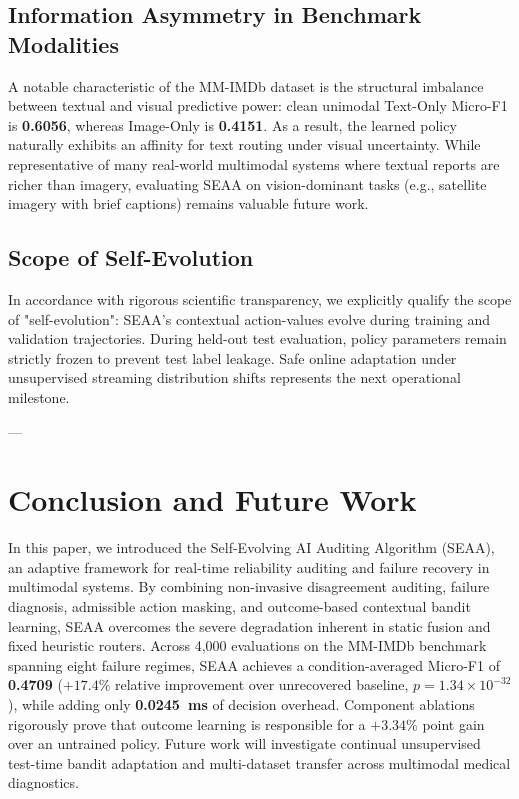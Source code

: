 \documentclass[journal]{IEEEtran}
\begin{document}
\subsection{Information Asymmetry in Benchmark Modalities}
A notable characteristic of the MM-IMDb dataset is the structural imbalance between textual and visual predictive power: clean unimodal Text-Only Micro-F1 is \textbf{0.6056}, whereas Image-Only is \textbf{0.4151}. As a result, the learned policy naturally exhibits an affinity for text routing under visual uncertainty. While representative of many real-world multimodal systems where textual reports are richer than imagery, evaluating SEAA on vision-dominant tasks (e.g., satellite imagery with brief captions) remains valuable future work.

\subsection{Scope of Self-Evolution}
In accordance with rigorous scientific transparency, we explicitly qualify the scope of "self-evolution": SEAA's contextual action-values evolve during training and validation trajectories. During held-out test evaluation, policy parameters remain strictly frozen to prevent test label leakage. Safe online adaptation under unsupervised streaming distribution shifts represents the next operational milestone.

---

\section{Conclusion and Future Work}
In this paper, we introduced the Self-Evolving AI Auditing Algorithm (SEAA), an adaptive framework for real-time reliability auditing and failure recovery in multimodal systems. By combining non-invasive disagreement auditing, failure diagnosis, admissible action masking, and outcome-based contextual bandit learning, SEAA overcomes the severe degradation inherent in static fusion and fixed heuristic routers. Across 4,000 evaluations on the MM-IMDb benchmark spanning eight failure regimes, SEAA achieves a condition-averaged Micro-F1 of \textbf{0.4709} ($+17.4\%$ relative improvement over unrecovered baseline, $p = 1.34 \times 10^{-32}$), while adding only \textbf{0.0245~ms} of decision overhead. Component ablations rigorously prove that outcome learning is responsible for a $+3.34\%$ point gain over an untrained policy. Future work will investigate continual unsupervised test-time bandit adaptation and multi-dataset transfer across multimodal medical diagnostics.



\end{document}
